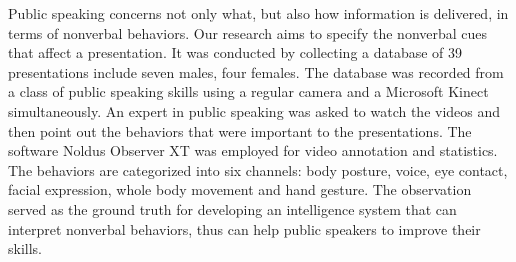 Public speaking concerns not only what, but also how information is delivered, in terms of nonverbal behaviors. Our research aims to specify the nonverbal cues that affect a presentation. It was conducted by collecting a database of 39 presentations include seven males, four females. The database was recorded from a class of public speaking skills using a regular camera and a Microsoft Kinect simultaneously. An expert in public speaking was asked to watch the videos and then point out the behaviors that were important to the presentations. The software Noldus Observer XT was employed for video annotation and statistics. The behaviors are categorized into six channels: body posture, voice, eye contact, facial expression, whole body movement and hand gesture. The observation served as the ground truth for developing an intelligence system that can interpret nonverbal behaviors, thus can help public speakers to improve their skills.